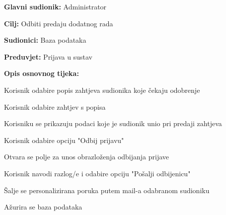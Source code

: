 					\noindent {}
					\begin{packed_item}
	
						\item \textbf{Glavni sudionik: } Administrator
						\item  \textbf{Cilj:} Odbiti predaju dodatnog rada
						\item  \textbf{Sudionici:} Baza podataka
						\item  \textbf{Preduvjet:} Prijava u sustav
						\item  \textbf{Opis osnovnog tijeka:}
						
						\item[] \begin{packed_enum}
	
							\item Korisnik odabire popis zahtjeva sudionika koje čekaju odobrenje
							\item Korisnik odabire zahtjev s popisa
							\item Korisniku se prikazuju podaci koje je sudionik unio pri predaji zahtjeva
							\item Korisnik odabire opciju "Odbij prijavu"
							\item Otvara se polje za unos obrazloženja odbijanja prijave
							\item Korisnik navodi razlog/e i odabire opciju "Pošalji odbijenicu"
							\item Šalje se personalizirana poruka putem mail-a odabranom sudioniku
							\item Ažurira se baza podataka

					
						\end{packed_enum}
			
					\end{packed_item}

